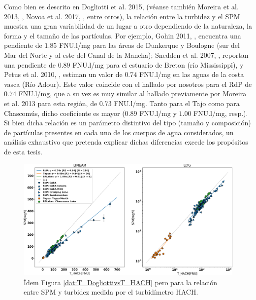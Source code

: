         Como bien es descrito en Dogliotti et al. 2015, \cite{dogliotti2015} (véanse también Moreira et al. 2013, \cite{moreira2013}, Novoa et al. 2017, \cite{novoa2017}, entre otros), la relación entre la turbidez y el SPM muestra una gran variabilidad de un lugar a otro dependiendo de la naturaleza, la forma y el tamaño de las partículas. Por ejemplo, Gohin 2011, \cite{gohin2011}, encuentra una pendiente de $1.85$ FNU.l/mg para las áreas de Dunkerque y Boulogne (sur del Mar del Norte y al este del Canal de la Mancha); Snedden et al. 2007, \cite{snedden2007}, reportan una pendiente de $0.89$ FNU.l/mg para el estuario de Breton (río Mississippi), y Petus et al. 2010, \cite{petus2010}, estiman un valor de $0.74$ FNU.l/mg en las aguas de la costa vasca (Río Adour). Este valor coincide con el hallado por nosotros para el RdP de $0.74$ FNU.l/mg, que a su vez es muy similar al hallado previamente por Moreira et al. 2013 para esta región, de $0.73$ FNU.l/mg. Tanto para el Tajo como para Chascomús, dicho coeficiente es mayor ($0.89$ FNU.l/mg y $1.00$ FNU.l/mg, resp.). Si bien dicha relación es un parámetro distintivo del tipo (tamaño y composición) de partículas presentes en cada uno de los cuerpos de agua considerados, un análisis exhaustivo que pretenda explicar dichas diferencias excede los propósitos de esta tesis.

        \begin{figure}
        \centering
        \includegraphics[width=\textwidth]{dat/figures/ScatterSPMvsT_HACH.png}
        \caption[Relación entre SPM y turbidez medida por el turbidímetro HACH.]{Ídem Figura \ref{dat:T_DogliottivsT_HACH} pero para la relación entre SPM y turbidez medida por el turbidímetro HACH.}
        \label{dat:SPMvsT_HACH}
        \end{figure}
        
